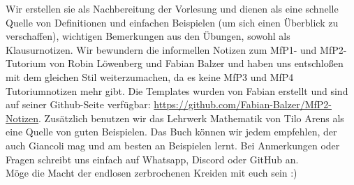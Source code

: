 Wir erstellen sie als Nachbereitung der Vorlesung und dienen als eine schnelle Quelle von Definitionen und einfachen Beispielen (um sich einen Überblick zu verschaffen), wichtigen Bemerkungen aus den Übungen, sowohl als Klausurnotizen. Wir bewundern die informellen Notizen zum MfP1- und MfP2-Tutorium von Robin Löwenberg und Fabian Balzer und haben uns entschloßen mit dem gleichen Stil weiterzumachen, da es keine MfP3 und MfP4 Tutoriumnotizen mehr gibt. Die Templates wurden von Fabian erstellt und sind auf seiner Github-Seite verfügbar:  \url{https://github.com/Fabian-Balzer/MfP2-Notizen}. Zusätzlich benutzen wir das Lehrwerk Mathematik von Tilo Arens als eine Quelle von guten Beispielen. Das Buch können wir jedem empfehlen, der auch Giancoli mag und am besten an Beispielen lernt. Bei Anmerkungen oder Fragen schreibt uns einfach auf Whatsapp, Discord oder GitHub an. \\ 

Möge die Macht der endlosen zerbrochenen Kreiden mit euch sein :)

\cfoot{\pagemark}
